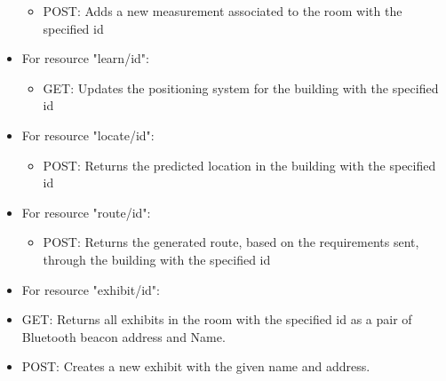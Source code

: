 \begin{itemize}
\begin{itemize}
	\item POST: Adds a new measurement associated to the room with the specified id
	\end{itemize}
\item For resource "learn/id":
	\begin{itemize}
	\item GET: Updates the positioning system for the building with the specified id
	\end{itemize}
\item For resource "locate/id":
	\begin{itemize}
	\item POST: Returns the predicted location in the building with the specified id
	\end{itemize}
\item For resource "route/id":
	\begin{itemize}
	\item POST: Returns the generated route, based on the requirements sent, through the building with the specified id
	\end{itemize}
\item For resource "exhibit/id":
	\item GET: Returns all exhibits in the room with the specified id as a pair of Bluetooth beacon address and Name.
	\item POST: Creates a new exhibit with the given name and address.
\end{itemize}

